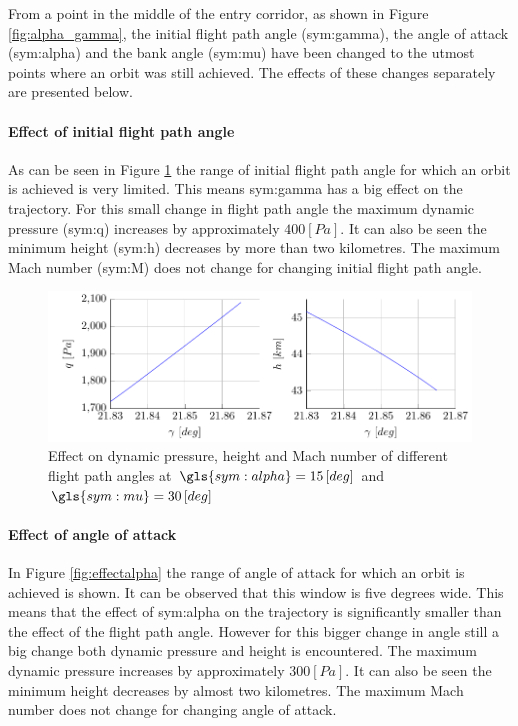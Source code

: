 From a point in the middle of the entry corridor, as shown in Figure \ref{fig:alpha_gamma}, the initial flight path angle (\gls{sym:gamma}), the angle of attack (\gls{sym:alpha}) and the bank angle (\gls{sym:mu}) have been changed to the utmost points where an orbit was still achieved. The effects of these changes separately are presented below.

\paragraph{Effect of initial flight path angle}
As can be seen in Figure \ref{fig:effectgamma} the range of initial flight path angle for which an orbit is achieved is very limited. This means \gls{sym:gamma} has a big effect on the trajectory. For this small change in flight path angle the maximum dynamic pressure (\gls{sym:q}) increases by approximately $400 \left[Pa\right]$. It can also be seen the minimum height (\gls{sym:h}) decreases by more than two kilometres. The maximum Mach number (\gls{sym:M}) does not change for changing initial flight path angle.

\begin{figure}[h]
	\centering
	\includegraphics[width=\textwidth]{./Figure/orbit/effectgamma2.pdf}
	\caption[Effect on dynamic pressure, height and Mach number of different flight path angles]{Effect on dynamic pressure, height and Mach number of different flight path angles at $\gls{sym:alpha}=15 \left[deg\right]$ and $\gls{sym:mu}=30 \left[deg\right]$}
	\label{fig:effectgamma}
\end{figure}

\paragraph{Effect of angle of attack}

In Figure \ref{fig:effectalpha} the range of angle of attack for which an orbit is achieved is shown. It can be observed that this window is five degrees wide. This means that the effect of \gls{sym:alpha} on the trajectory is significantly smaller than the effect of the flight path angle. However for this bigger change in angle still a big change both dynamic pressure and height is encountered. The maximum dynamic pressure increases by approximately $300 \left[Pa\right]$. It can also be seen the minimum height decreases by almost two kilometres. The maximum Mach number does not change for changing angle of attack.

